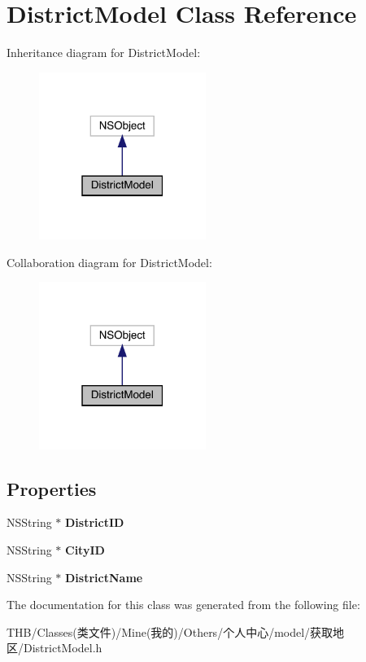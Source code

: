 \hypertarget{interface_district_model}{}\section{District\+Model Class Reference}
\label{interface_district_model}


Inheritance diagram for District\+Model\+:\nopagebreak
\begin{figure}[H]
\begin{center}
\leavevmode
\includegraphics[width=154pt]{interface_district_model__inherit__graph}
\end{center}
\end{figure}


Collaboration diagram for District\+Model\+:\nopagebreak
\begin{figure}[H]
\begin{center}
\leavevmode
\includegraphics[width=154pt]{interface_district_model__coll__graph}
\end{center}
\end{figure}
\subsection*{Properties}
\begin{DoxyCompactItemize}
\item 
\mbox{\label{interface_district_model_a9cd9aeb6d74610f50268e643c86e3059}} 
N\+S\+String $\ast$ {\bfseries District\+ID}
\item 
\mbox{\label{interface_district_model_aedeb94b6f38dd37270d8301cae15c34a}} 
N\+S\+String $\ast$ {\bfseries City\+ID}
\item 
\mbox{\label{interface_district_model_a6668da33db958e50bf20e43d11aa7103}} 
N\+S\+String $\ast$ {\bfseries District\+Name}
\end{DoxyCompactItemize}


The documentation for this class was generated from the following file\+:\begin{DoxyCompactItemize}
\item 
T\+H\+B/\+Classes(类文件)/\+Mine(我的)/\+Others/个人中心/model/获取地区/District\+Model.\+h\end{DoxyCompactItemize}
